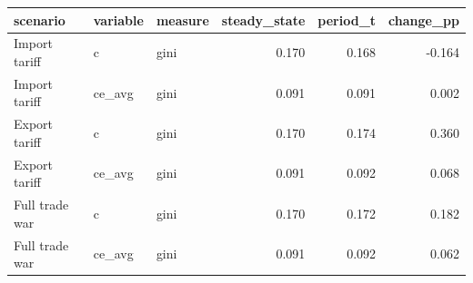 \begin{tabular}{lllrrr}
\toprule
scenario & variable & measure & steady_state & period_t & change_pp \\
\midrule
Import tariff & c & gini & 0.170 & 0.168 & -0.164 \\
Import tariff & ce_avg & gini & 0.091 & 0.091 & 0.002 \\
Export tariff & c & gini & 0.170 & 0.174 & 0.360 \\
Export tariff & ce_avg & gini & 0.091 & 0.092 & 0.068 \\
Full trade war & c & gini & 0.170 & 0.172 & 0.182 \\
Full trade war & ce_avg & gini & 0.091 & 0.092 & 0.062 \\
\bottomrule
\end{tabular}
